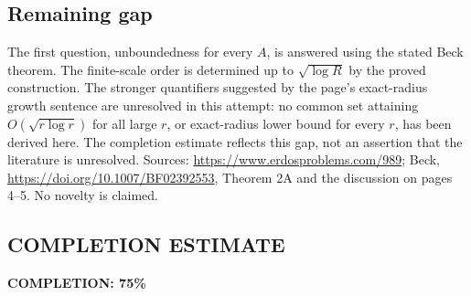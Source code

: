 \subsection*{Remaining gap}
The first question, unboundedness for every $A$, is answered using the stated Beck theorem. The finite-scale order is determined up to $\sqrt{\log R}$ by the proved construction. The stronger quantifiers suggested by the page's exact-radius growth sentence are unresolved in this attempt: no common set attaining $O(\sqrt{r\log r})$ for all large $r$, or exact-radius lower bound for every $r$, has been derived here. The completion estimate reflects this gap, not an assertion that the literature is unresolved.
Sources: \url{https://www.erdosproblems.com/989}; Beck, \url{https://doi.org/10.1007/BF02392553}, Theorem 2A and the discussion on pages 4--5. No novelty is claimed.
\subsection*{COMPLETION ESTIMATE}
\textbf{COMPLETION: 75\%}
